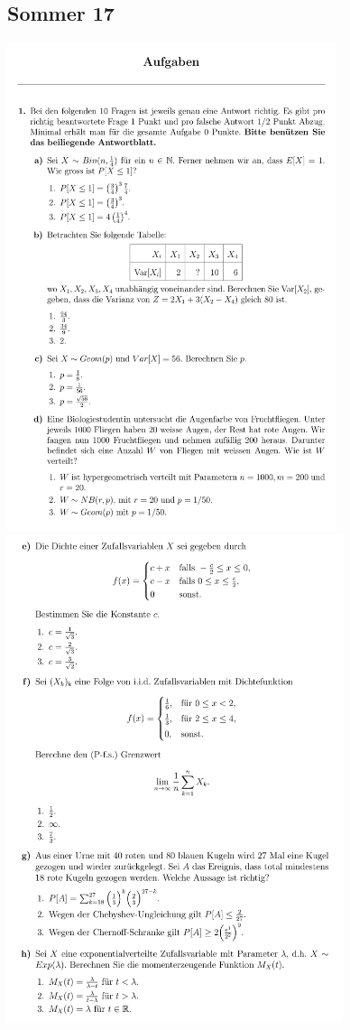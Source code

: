 

\subsection{Sommer 17}

\includegraphics[height=143mm]{old_exams_prtsrc/aufgaben/tei_infk_so17_pr-3.png}\newline
\includegraphics[height=143mm]{old_exams_prtsrc/aufgaben/tei_infk_so17_pr-4.png}\newline
